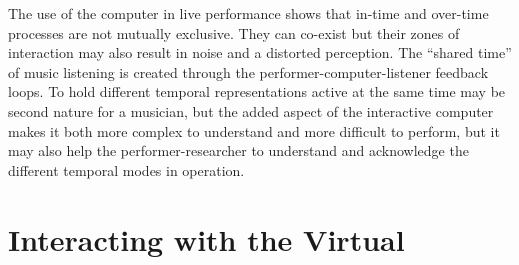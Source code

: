 The use of the computer in live performance shows that in-time and over-time processes are not mutually exclusive. They can co-exist but their zones of interaction may also result in noise and a distorted perception. The ``shared time'' of music listening is created through the performer-computer-listener feedback loops. To hold different temporal representations active at the same time may be second nature for a musician, but the added aspect of the interactive computer makes it both more complex to understand and more difficult to perform, but it may also help the performer-researcher to understand and acknowledge the different temporal modes in operation.





\section{Interacting with the Virtual}
\label{sec:inter-with-virt}

